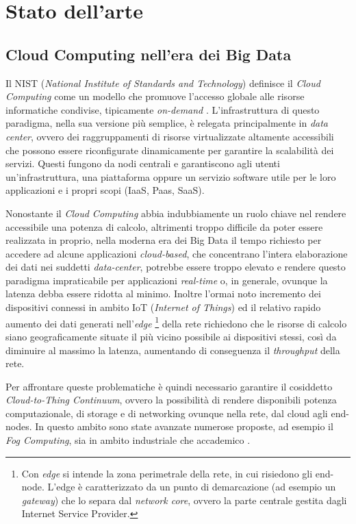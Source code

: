 \chapter{Stato dell'arte}

\section{Cloud Computing nell'era dei Big Data}

Il NIST (\textit{National Institute of Standards and Technology}) definisce il \textit{Cloud Computing} come un modello che promuove l'accesso globale alle risorse informatiche condivise, tipicamente \textit{on-demand} \cite{NISTCloudComputing}. L'infrastruttura di questo paradigma, nella sua versione più semplice, è relegata principalmente in \textit{data center}, ovvero dei raggruppamenti di risorse virtualizzate altamente accessibili che possono essere riconfigurate dinamicamente per garantire la scalabilità dei servizi. Questi fungono da nodi centrali e garantiscono agli utenti un'infrastruttura, una piattaforma oppure un servizio software utile per le loro applicazioni e i propri scopi (IaaS, Paas, SaaS).

Nonostante il \textit{Cloud Computing} abbia indubbiamente un ruolo chiave nel rendere accessibile una potenza di calcolo, altrimenti troppo difficile da poter essere realizzata in proprio, nella moderna era dei Big Data il tempo richiesto per accedere ad alcune applicazioni \textit{cloud-based}, che concentrano l'intera elaborazione dei dati nei suddetti \textit{data-center}, potrebbe essere troppo elevato e rendere questo paradigma impraticabile per applicazioni \textit{real-time} o, in generale, ovunque la latenza debba essere ridotta al minimo. Inoltre l'ormai noto incremento dei dispositivi connessi in ambito IoT (\textit{Internet of Things}) ed il relativo rapido aumento dei dati generati nell'\textit{edge} \footnote{Con \textit{edge} si intende la zona perimetrale della rete, in cui risiedono gli end-node. L'edge è caratterizzato da un punto di demarcazione (ad esempio un \textit{gateway}) che lo separa dal \textit{network core}, ovvero la parte centrale gestita dagli Internet Service Provider.} della rete richiedono che le risorse di calcolo siano geograficamente situate il più vicino possibile ai dispositivi stessi, così da diminuire al massimo la latenza, aumentando di conseguenza il \textit{throughput} della rete.

Per affrontare queste problematiche è quindi necessario garantire il cosiddetto \textit{Cloud-to-Thing Continuum}, ovvero la possibilità di rendere disponibili potenza computazionale, di storage e di networking ovunque nella rete, dal cloud agli end-nodes. In questo ambito sono state avanzate numerose proposte, ad esempio il \textit{Fog Computing}, sia in ambito industriale che accademico \cite{OpenFogReferenceArchitecture, FogComputingInIoT}.


